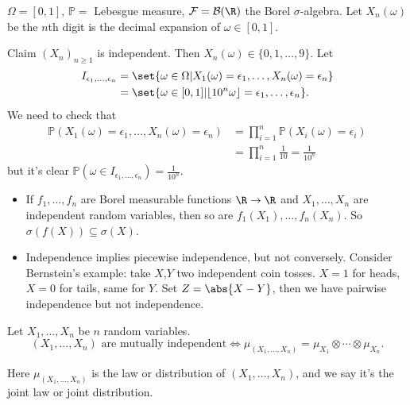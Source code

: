 \documentclass{article}
\newcommand{\1}[1]{\mathbbm{1}_{#1}}
\newcommand{\Prob}{\mathbb{P}}
\DeclarePairedDelimiter\floor{\lfloor}{\rfloor}
\begin{document}
\begin{eg}
    $\Omega = [0, 1]$, $\Prob =$ Lebesgue measure, $\mathcal{F} = \mathcal{B}(\R)$ the Borel $\sigma$-algebra.
    Let $X_n(\omega)$ be the $n$th digit is the decimal expansion of $\omega \in [0, 1]$.

    Claim $(X_n)_{n \geq 1}$ is independent. Then $X_n(\omega) \in \{0, 1, \dotsc, 9\}$.
    Let
    \begin{align*}
        I_{\epsilon_1, \dotsc, \epsilon_n} &= \set{\omega \in \Omega | X_1(\omega) = \epsilon_1, \dotsc, X_n(\omega) = \epsilon_n} \\
                                           &= \set{\omega \in [0, 1] | \floor{10^n \omega} = \epsilon_1, \dotsc, \epsilon_n}.
    \end{align*}
    We need to check that
    \begin{align*}
        \Prob(X_1(\omega) = \epsilon_1, \dotsc, X_n(\omega) = \epsilon_n) &= \prod_{i=1}^n \Prob(X_i(\omega) = \epsilon_i) \\
                                                                          &= \prod_{i=1}^n \frac{1}{10} = \frac{1}{10^n}
    \end{align*}
    but it's clear $\Prob(\omega \in I_{\epsilon_1, \dotsc, \epsilon_n}) = \frac{1}{10^n}$.
\end{eg}

\begin{remark}
    \begin{itemize}
        \item If $f_1, \dotsc, f_n$ are Borel measurable functions $\R \to \R$ and $X_1, \dotsc, X_n$ are independent random variables, then so are $f_1(X_1), \dotsc, f_n(X_n)$.
            So $\sigma(f(X)) \subseteq \sigma(X)$.
        \item Independence implies piecewise independence, but not conversely.
            Consider Bernstein's example: take $X$,$Y$ two independent coin tosses.
            $X=1$ for heads, $X=0$ for tails, same for $Y$.
            Set $Z=\abs{X-Y}$, then we have pairwise independence but not independence.
    \end{itemize}
\end{remark}

\begin{prop}
    Let $X_1, \dotsc, X_n$ be $n$ random variables.
    \begin{equation*}
        (X_1, \dotsc, X_n) \text{ are mutually independent} \iff \mu_{(X_1, \dotsc, X_n)} = \mu_{X_1} \otimes \dotsb \otimes \mu_{X_n}.
    \end{equation*}

    Here $\mu_{(X_1, \dotsc, X_n)}$ is the law or distribution of $(X_1, \dotsc, X_n)$, and we say it's the joint law or joint distribution.
\end{prop}
\end{document}

